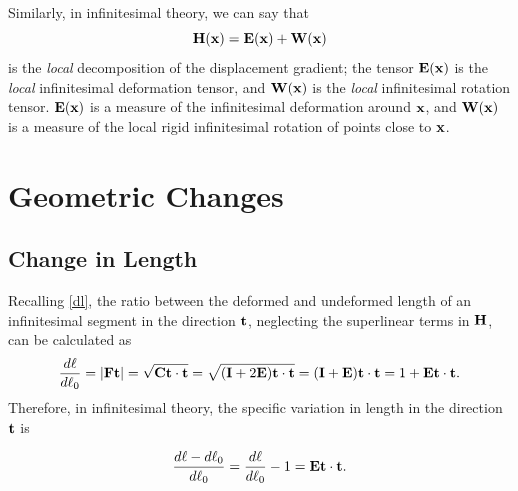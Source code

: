 Similarly, in infinitesimal theory, we can say that
\begin{equation}
	\mathbf{H}(\mathbf{x})=\mathbf{E}(\mathbf{x})+\mathbf{W}(\mathbf{x})
\end{equation}
is the \textit{local} decomposition of the displacement gradient; the tensor \(\mathbf{E}(\mathbf{x})\) is the \textit{local} infinitesimal deformation tensor, and \(\mathbf{W}(\mathbf{x})\) is the \textit{local} infinitesimal rotation tensor. \(\mathbf{E}(\mathbf{x})\) is a measure of the infinitesimal deformation around \(\mathbf{x}\), and \(\mathbf{W}(\mathbf{x})\) is a measure of the local rigid infinitesimal rotation of points close to \(\mathbf{x}\).



\section{Geometric Changes}

\subsection{Change in Length}
Recalling \eqref{dl}, the ratio between the deformed and undeformed length of an infinitesimal segment in the direction $\mathbf{t}$, neglecting the superlinear terms in $\mathbf{H}$, can be calculated as
\begin{equation}
	\frac{d\ell}{d\ell_0}=|\mathbf{F}\mathbf{t}|=\sqrt{\mathbf{C}\mathbf{t}\cdot\mathbf{t}}=\sqrt{(\mathbf{I}+2\mathbf{E})\mathbf{t}\cdot\mathbf{t}}=(\mathbf{I}+\mathbf{E})\mathbf{t}\cdot\mathbf{t}=1+\mathbf{E}\mathbf{t}\cdot\mathbf{t}.
\end{equation}
Therefore, in infinitesimal theory, the specific variation in length in the direction $\mathbf{t}$ is
\begin{definition}
	\begin{equation}\label{Ett}
		\frac{d\ell-d\ell_0}{d\ell_0}=\frac{d\ell}{d\ell_0}-1=\mathbf{E}\mathbf{t}\cdot\mathbf{t}.
	\end{equation}
\end{definition}

